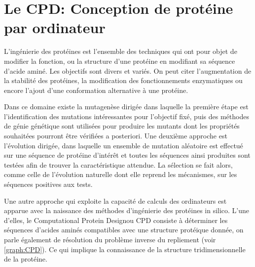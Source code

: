 
\chapter{Le \og CPD\fg: Conception de protéine par ordinateur}
\label{chap:CPD}

L'ingénierie des protéines est l'ensemble des techniques qui ont pour objet de modifier la fonction, ou la structure d'une protéine en modifiant sa séquence d'acide aminé. Les objectifs sont divers et variés. On peut citer l'augmentation de la stabilité des protéines, la  modification des fonctionnements enzymatiques ou encore l'ajout d'une conformation alternative à une protéine.

Dans ce domaine existe la mutagenèse dirigée dans laquelle la première étape est l'identification des mutations intéressantes pour l'objectif fixé, puis des méthodes de génie génétique sont utilisées pour produire les mutants dont les propriétés souhaitées pourront être vérifiées a posteriori. Une deuxième approche est l'évolution dirigée, dans laquelle un ensemble de mutation aléatoire est effectué sur une séquence de protéine d'intérêt et toutes les séquences ainsi produites sont testées afin de trouver la caractéristique attendue. La sélection se fait alors, comme celle de l'évolution naturelle dont elle reprend les mécanismes, sur les séquences positives aux tests.



Une autre approche qui exploite la capacité de calculs des ordinateurs est apparue avec la naissance des méthodes d'ingénierie des protéines \og in silico\fg. L'une d'elles, le \og Computational Protein Design\fg ou CPD consiste à déterminer les séquences d'acides aminés compatibles avec une structure protéique donnée, on parle également de résolution du problème inverse du repliement (voir \ref{graph:CPD}). Ce qui implique la connaissance de la structure tridimensionnelle de la protéine. 

